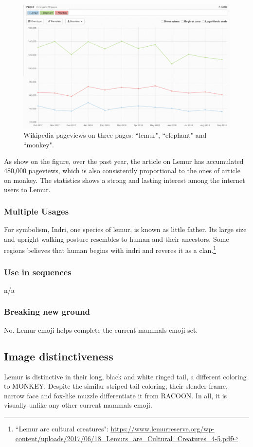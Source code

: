 \documentclass{article}
\begin{document}
\begin{figure}[h]
  \includegraphics[width=\linewidth]{img/wikipedia-pageviews.png}
  \caption{Wikipedia pageviews on three pages: ``lemur", ``elephant" and ``monkey".}
  \label{fig:wikipedia-pageviews}
\end{figure}

As show on the figure, over the past year, the article on Lemur has accumulated 480,000 pageviews, which is also consistently proportional to the ones of article on monkey. The statistics shows a strong and lasting interest among the internet users to Lemur.

\subsubsection{Multiple Usages}
For symbolism, Indri, one species of lemur, is known as little father. Its large size and upright walking posture resembles to human and their ancestors. Some regions believes that human begins with indri and reveres it as a clan.\footnote{``Lemur are cultural creatures": \url{https://www.lemurreserve.org/wp-content/uploads/2017/06/18\_Lemurs\_are\_Cultural\_Creatures\_4-5.pdf}}

\subsubsection{Use in sequences}
n/a

\subsubsection{Breaking new ground}
No. Lemur emoji helps complete the current mammals emoji set.

\subsection{Image distinctiveness}
Lemur is distinctive in their long, black and white ringed tail, a different coloring to MONKEY. Despite the similar striped tail coloring, 
their slender frame, narrow face and fox-like muzzle differentiate it from RACOON.
In all, it is visually unlike any other current mammals emoji.
\end{document}
